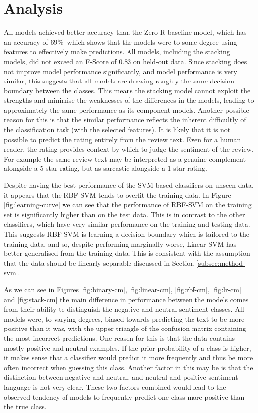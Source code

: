 \documentclass[11pt]{article}
\begin{document}
\section{Analysis}
All models achieved better accuracy than the Zero-R baseline model, which has an accuracy of $69 \%$, which shows that the models were to some degree using features to effectively make predictions. All models, including the stacking models, did not exceed an F-Score of 0.83 on held-out data. Since stacking does not improve model performance significantly, and model performance is very similar, this suggests that all models are drawing roughly the same decision boundary between the classes. This means the stacking model cannot exploit the strengths and minimise the weaknesses of the differences in the models, leading to approximately the same performance as its component models. Another possible reason for this is that the similar performance reflects the inherent difficultly of the classification task (with the selected features). It is likely that it is not possible to predict the rating entirely from the review text. Even for a human reader, the rating provides context by which to judge the sentiment of the review. For example the same review text may be interpreted as a genuine complement alongside a 5 star rating, but as sarcastic alongside a 1 star rating.

Despite having the best performance of the SVM-based classifiers on unseen data, it appears that the RBF-SVM tends to overfit the training data. In Figure \ref{fig:learning-curve} we can see that the performance of RBF-SVM on the training set is significantly higher than on the test data. This is in contrast to the other classifiers, which have very similar performance on the training and testing data. This suggests RBF-SVM is learning a decision boundary which is tailored to the training data, and so, despite performing marginally worse, Linear-SVM has better generalised from the training data. This is consistent with the assumption that the data should be linearly separable discussed in Section \ref{subsec:method-svm}.

As we can see in Figures \ref{fig:binary-cm}, \ref{fig:linear-cm}, \ref{fig:rbf-cm}, \ref{fig:lr-cm} and \ref{fig:stack-cm} the main difference in performance between the models comes from their ability to distinguish the negative and neutral sentiment classes. All models were, to varying degrees, biased towards predicting the text to be more positive than it was, with the upper triangle of the confusion matrix containing the most incorrect predictions. One reason for this is that the data contains mostly positive and neutral examples. If the prior probability of a class is higher, it makes sense that a classifier would predict it more frequently and thus be more often incorrect when guessing this class. Another factor in this may be is that the distinction between negative and neutral, and neutral and positive sentiment language is not very clear. These two factors combined would lead to the observed tendency of models to frequently predict one class more positive than the true class.
\end{document}
